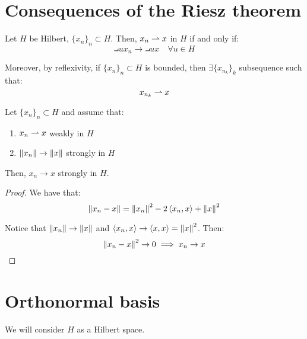 \section{Consequences of the Riesz theorem}

\begin{ftheorem}
    Let $H$ be Hilbert, $\{x_n\}_n \subset H$. Then, $x_n \rightharpoonup x$ in $H$ if and only if:
    $$\intprod{u}{x_n} \to \intprod{u}{x} \quad \forall u \in H$$

    Moreover, by reflexivity, if $\{x_n\}_n \subset H$ is bounded, then $\exists \{x_{n_k}\}_k$ subsequence
    such that:
    $$x_{n_k} \rightharpoonup x$$
\end{ftheorem}

\vspace{1em}

\begin{fproposition}
    Let $\{x_n\}_n \subset H$ and assume that:
    \vspace{1em}
    \begin{enumerate}[label=(\roman*)]
        \item $x_n \rightharpoonup x$ weakly in $H$
        \vspace{1em}
        \item $\left\|x_n\right\| \to \left\|x\right\|$ strongly in $H$
    \end{enumerate}
    \vspace{1em}
    Then, $x_n \to x$ strongly in $H$.
\end{fproposition}

\begin{proof}
    We have that:
    $$\left\|x_n - x\right\| = \left\|x_n\right\|^2 - 2 \left\langle x_n, x \right\rangle + \left\|x\right\|^2$$

    Notice that $\left\|x_n\right\| \to \left\|x\right\|$ and $\left\langle x_n, x \right\rangle \to \left\langle x, x \right\rangle = \left\|x\right\|^2$. Then:
    $$\left\|x_n - x\right\|^2 \to 0 \implies x_n \to x$$

\end{proof}

\section{Orthonormal basis}

\begin{note}
    We will consider $H$ as a Hilbert space.
\end{note}

